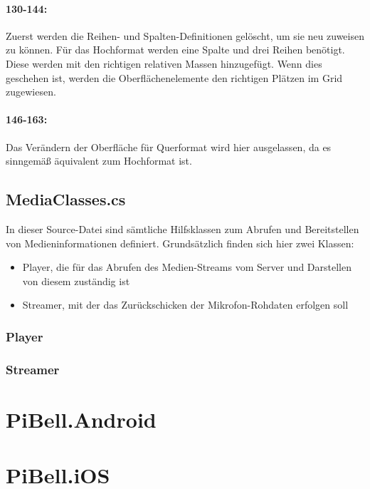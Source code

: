 \paragraph{130-144:} Zuerst werden die Reihen- und Spalten-Definitionen gelöscht, um sie neu zuweisen zu können.
Für das Hochformat werden eine Spalte und drei Reihen benötigt.
Diese werden mit den richtigen relativen Massen hinzugefügt.
Wenn dies geschehen ist, werden die Oberflächenelemente den richtigen Plätzen im Grid zugewiesen.
\paragraph{146-163:} Das Verändern der Oberfläche für Querformat wird hier ausgelassen, da es sinngemäß äquivalent zum Hochformat ist.
\subsection{MediaClasses.cs}
\label{ssec:classes}
In dieser Source-Datei sind sämtliche Hilfsklassen zum Abrufen und Bereitstellen von Medieninformationen definiert.
Grundsätzlich finden sich hier zwei Klassen:
\begin{itemize}
    \item Player, die für das Abrufen des Medien-Streams vom Server und Darstellen von diesem zuständig ist
    \item Streamer, mit der das Zurückschicken der Mikrofon-Rohdaten erfolgen soll
\end{itemize}
\subsubsection{Player}


\subsubsection{Streamer}

\section{PiBell.Android}
\blindtext

\section{PiBell.iOS}
\blindtext